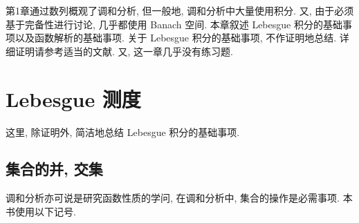 
第1章通过数列概观了调和分析, 但一般地, 调和分析中大量使用积分. 又, 由于必须基于完备性进行讨论, 几乎都使用 Banach 空间. 本章叙述 Lebesgue 积分的基础事项以及函数解析的基础事项. 关于 Lebesgue 积分的基础事项, 不作证明地总结. 详细证明请参考适当的文献. 又, 这一章几乎没有练习题.

\section{Lebesgue 测度}\label{sec:2.1}


































这里, 除证明外, 简洁地总结 Lebesgue 积分的基础事项.

\subsection*{集合的并, 交集}

调和分析亦可说是研究函数性质的学问, 在调和分析中, 集合的操作是必需事项. 本书使用以下记号.

